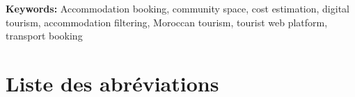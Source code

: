 \documentclass[a4paper,12pt]{report}
\begin{document}
\textbf{Keywords:} Accommodation booking, community space, cost estimation, digital tourism, accommodation filtering, Moroccan tourism, tourist web platform, transport booking

\newpage
\tableofcontents

\newpage
{}
{}
\listoffigures


\newpage
{}
{}
\listoftables

\newpage
\chapter*{Liste des abréviations}

\vspace{0.5cm}
\end{document}
